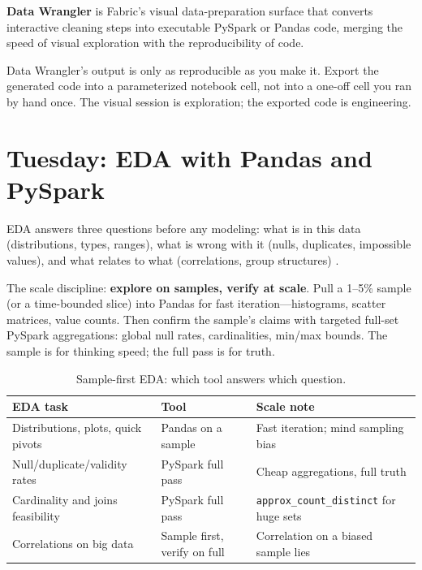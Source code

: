 \begin{definitionbox}
\textbf{Data Wrangler} is Fabric's visual data-preparation surface that converts interactive cleaning steps into executable PySpark or Pandas code, merging the speed of visual exploration with the reproducibility of code.
\end{definitionbox}

\begin{pitfall}
Data Wrangler's output is only as reproducible as you make it. Export the generated code into a parameterized notebook cell, not into a one-off cell you ran by hand once. The visual session is exploration; the exported code is engineering.
\end{pitfall}

\section{Tuesday: EDA with Pandas and PySpark}
EDA answers three questions before any modeling: what is in this data (distributions, types, ranges), what is wrong with it (nulls, duplicates, impossible values), and what relates to what (correlations, group structures) \cite{microsoftFabricDataScience}.

The scale discipline: \textbf{explore on samples, verify at scale}. Pull a 1--5\% sample (or a time-bounded slice) into Pandas for fast iteration---histograms, scatter matrices, value counts. Then confirm the sample's claims with targeted full-set PySpark aggregations: global null rates, cardinalities, min/max bounds. The sample is for thinking speed; the full pass is for truth.

\begin{table}[H]
\centering
\small
\begin{tabular}{@{}p{4.6cm}p{4.4cm}p{4.6cm}@{}}
\toprule
\textbf{EDA task} & \textbf{Tool} & \textbf{Scale note} \\
\midrule
Distributions, plots, quick pivots & Pandas on a sample & Fast iteration; mind sampling bias \\
Null/duplicate/validity rates & PySpark full pass & Cheap aggregations, full truth \\
Cardinality and joins feasibility & PySpark full pass & \texttt{approx\_count\_distinct} for huge sets \\
Correlations on big data & Sample first, verify on full & Correlation on a biased sample lies \\
\bottomrule
\end{tabular}
\caption{Sample-first EDA: which tool answers which question.}
\label{tab:chapter17-eda}
\end{table}

